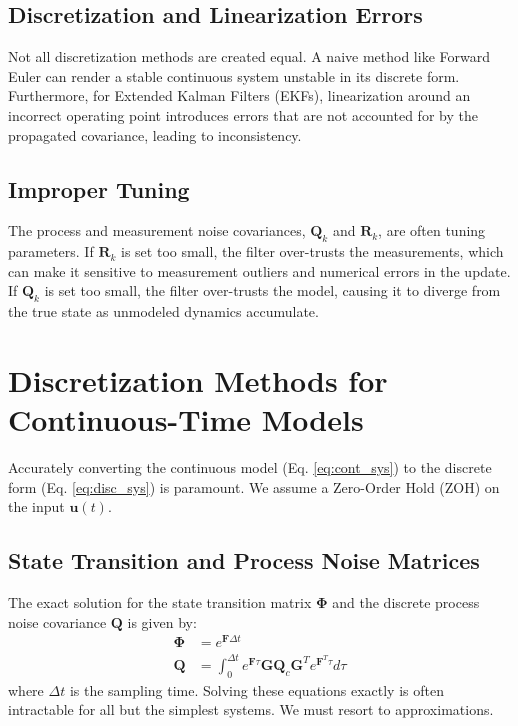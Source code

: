 \documentclass[11pt]{article}
\begin{document}
\subsection{Discretization and Linearization Errors}
Not all discretization methods are created equal. A naive method like Forward Euler can render a stable continuous system unstable in its discrete form. Furthermore, for Extended Kalman Filters (EKFs), linearization around an incorrect operating point introduces errors that are not accounted for by the propagated covariance, leading to inconsistency.

\subsection{Improper Tuning}
The process and measurement noise covariances, $\bm{Q}_k$ and $\bm{R}_k$, are often tuning parameters. If $\bm{R}_k$ is set too small, the filter over-trusts the measurements, which can make it sensitive to measurement outliers and numerical errors in the update. If $\bm{Q}_k$ is set too small, the filter over-trusts the model, causing it to diverge from the true state as unmodeled dynamics accumulate.

\section{Discretization Methods for Continuous-Time Models}
\label{sec:discretization}
Accurately converting the continuous model (Eq. \ref{eq:cont_sys}) to the discrete form (Eq. \ref{eq:disc_sys}) is paramount. We assume a Zero-Order Hold (ZOH) on the input $\bm{u}(t)$.

\subsection{State Transition and Process Noise Matrices}
The exact solution for the state transition matrix $\bm{\Phi}$ and the discrete process noise covariance $\bm{Q}$ is given by:
\begin{align}
\bm{\Phi} &= e^{\bm{F} \Delta t} \label{eq:exact_phi}\\
\bm{Q} &= \int_{0}^{\Delta t} e^{\bm{F} \tau} \bm{G} \bm{Q}_c \bm{G}^T e^{\bm{F}^T \tau}  d\tau \label{eq:exact_q}
\end{align}
where $\Delta t$ is the sampling time. Solving these equations exactly is often intractable for all but the simplest systems. We must resort to approximations.
\end{document}
